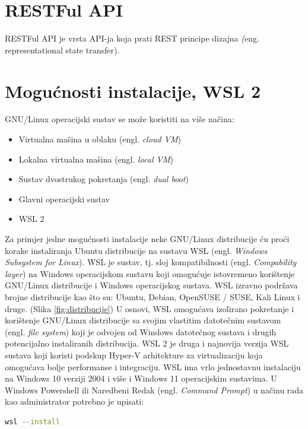 \documentclass{foi}
\begin{document}
\section{RESTFul API}
RESTFul API je vrsta API-ja koja prati REST principe dizajna \textit(eng. {representational state transfer}). 

\section{Mogućnosti instalacije, WSL 2}
GNU/Linux operacijski sustav se može koristiti na više načina\cite{MS_howto}:
\begin{itemize}
    \item Virtualna mašina u oblaku (engl. \textit{cloud VM})
    \item Lokalna virtualna mašina (engl. \textit{local VM})
    \item Sustav dvostrukog pokretanja (engl. \textit{dual boot})
    \item Glavni operacijski sustav
    \item WSL 2
\end{itemize}
Za primjer jedne mogućnosti instalacije neke GNU/Linux distribucije ću proći korake instaliranja Ubuntu distribucije na sustavu WSL (engl. \textit{Windows Subsystem for Linux}). WSL je sustav, tj. sloj kompatibilnosti (engl. \textit{Compability layer}) na Windows operacijskom sustavu koji omogućuje istovremeno korištenje GNU/Linux distribucije i Windows operacijskog sustava.\cite{MS_whatis_wsl} WSL izravno podržava brojne distribucije kao što su: Ubuntu, Debian, OpenSUSE / SUSE, Kali Linux i druge. (Slika \ref{fig:distribucije}) U osnovi, WSL omogućava izolirano pokretanje i korištenje GNU/Linux distribucije sa svojim vlastitim datotečnim sustavom (engl. \textit{file system}) koji je odvojen od Windows datotečnog sustava i drugih potencijalno instaliranih distribucija. WSL 2 je druga i najnovija verzija WSL sustava koji koristi podskup Hyper-V arhitekture za virtualizaciju koja omogućava bolje performanse i integraciju.\cite{hyperv}
WSL ima vrlo jednostavnu instalaciju na Windows 10 verziji 2004 i više i Windows 11 operacijskim sustavima\cite{MS_install_wsl}. U Windows Powershell ili Naredbeni Redak (engl. \textit{Command Prompt}) u načinu rada kao administrator potrebno je upisati:


\begin{lstlisting}[language=bash]
wsl --install
\end{lstlisting}
\end{document}
